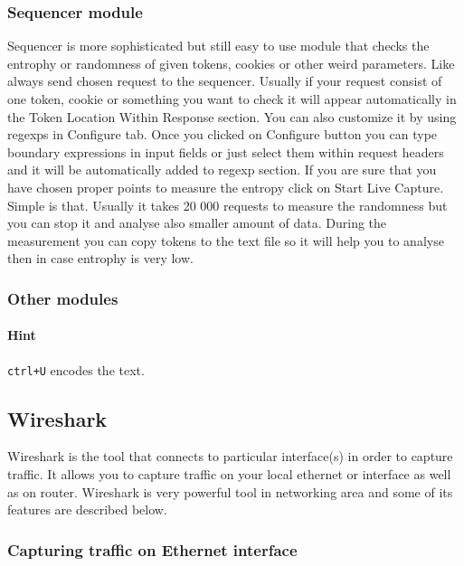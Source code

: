 \documentclass{article}[12pt]
\begin{document}
\subsubsection{Sequencer module}
Sequencer is more sophisticated but still easy to use module that checks the entrophy or randomness of given tokens, cookies or other weird parameters.
Like always send chosen request to the sequencer.
Usually if your request consist of one token, cookie or something you want to check it will appear automatically in the Token Location Within Response section.
You can also customize it by using regexps in Configure tab.
Once you clicked on Configure button you can type boundary expressions in input fields or just select them within request headers and it will be automatically added to regexp section.
If you are sure that you have chosen proper points to measure the entropy click on Start Live Capture.
Simple is that.
Usually it takes 20 000 requests to measure the randomness but you can stop it and analyse also smaller amount of data.
During the measurement you can copy tokens to the text file so it will help you to analyse then in case entrophy is very low.

\subsubsection{Other modules}


\paragraph{Hint} \texttt{ctrl+U} encodes the text.

\subsection{Wireshark}
\label{subsec:wireshark}

Wireshark is the tool that connects to particular interface(s) in order to capture traffic.
It allows you to capture traffic on your local ethernet or interface as well as on router.
Wireshark is very powerful tool in networking area and some of its features are described below.

\subsubsection{Capturing traffic on Ethernet interface}
\end{document}
